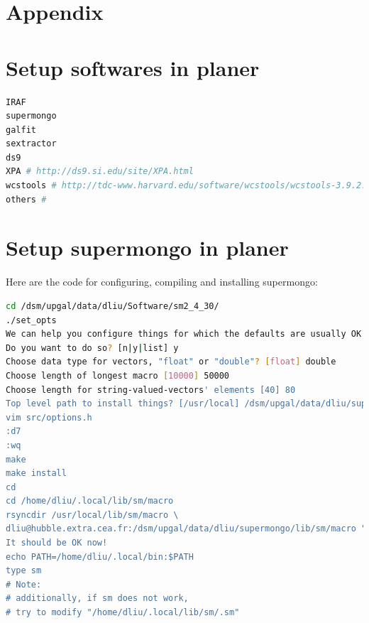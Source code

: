 \documentclass[11pt,a4paper]{article}
\begin{document}

\clearpage

\appendix
\section{Appendix}
\label{Appendix}


\clearpage


\section{Setup softwares in planer}
\label{Appendix_Software_Dependencies}

\begin{lstlisting}[language=bash]
IRAF
supermongo
galfit
sextractor
ds9
XPA # http://ds9.si.edu/site/XPA.html
wcstools # http://tdc-www.harvard.edu/software/wcstools/wcstools-3.9.2.tar.gz
others # 
\end{lstlisting}


\clearpage

\section{Setup supermongo in planer}
\label{Appendix_Supermongo}

Here are the code for configuring, compiling and installing supermongo: 

\begin{lstlisting}[language=bash]
cd /dsm/upgal/data/dliu/Software/sm2_4_30/
./set_opts
We can help you configure things for which the defaults are usually OK
Do you want to do so? [n|y|list] y
Choose data type for vectors, "float" or "double"? [float] double
Choose length of longest macro [10000] 50000
Choose length for string-valued-vectors' elements [40] 80
Top level path to install things? [/usr/local] /dsm/upgal/data/dliu/supermongo
vim src/options.h
:d7
:wq
make
make install
cd
cd /home/dliu/.local/lib/sm/macro
rsyncdir /usr/local/lib/sm/macro \
dliu@hubble.extra.cea.fr:/dsm/upgal/data/dliu/supermongo/lib/sm/macro "*.sm"
It should be OK now!
echo PATH=/home/dliu/.local/bin:$PATH
type sm
# Note:
# additionally, if sm does not work, 
# try to modify "/home/dliu/.local/lib/sm/.sm"
\end{lstlisting}
\end{document}
